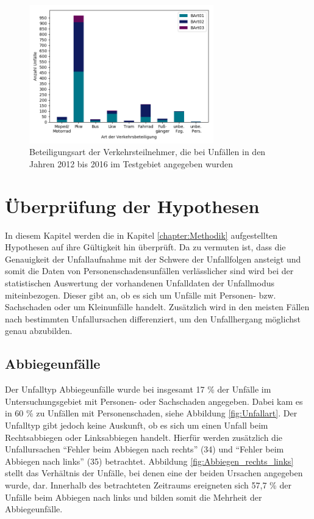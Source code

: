 \begin{savenotes}
	\begin{figure}[H]
		\centering
		\includegraphics[width=8cm,height=6cm]{figures/BArt}
		\caption[Beteiligungsart der Verkehrsteilnehmer, die bei Unfällen in den Jahren 2012 bis 2016 im Testgebiet angegeben wurden]{Beteiligungsart der Verkehrsteilnehmer, die bei Unfällen in den Jahren 2012 bis 2016 im Testgebiet angegeben wurden}\label{fig:Beteiligungsart}
	\end{figure}
\end{savenotes}

\section{Überprüfung der Hypothesen}\label{sechtion:Überprüfung der Thesen}
In diesem Kapitel werden die in Kapitel \ref{chapter:Methodik} aufgestellten Hypothesen auf ihre Gültigkeit hin überprüft. Da zu vermuten ist, dass die Genauigkeit der Unfallaufnahme mit der Schwere der Unfallfolgen ansteigt und somit die Daten von Personenschadensunfällen verlässlicher sind \parencite[S. 11]{StatistischesBundesamt.2018b} wird bei der statistischen Auswertung der vorhandenen Unfalldaten der Unfallmodus miteinbezogen. Dieser gibt an, ob es sich um Unfälle mit Personen- bzw. Sachschaden oder um Kleinunfälle handelt. Zusätzlich wird in den meisten Fällen nach bestimmten Unfallursachen differenziert, um den Unfallhergang möglichst genau abzubilden. %

\subsection{Abbiegeunfälle}\label{subsechtion:Abbiegeunfälle}
Der Unfalltyp Abbiegeunfälle wurde bei insgesamt 17 \% der Unfälle im Untersuchungsgebiet mit Personen- oder Sachschaden angegeben. Dabei kam es in 60 \% zu Unfällen mit Personenschaden, siehe Abbildung \ref{fig:Unfallart}. Der Unfalltyp gibt jedoch keine Auskunft, ob es sich um einen Unfall beim Rechtsabbiegen oder Linksabbiegen handelt. Hierfür werden zusätzlich die Unfallursachen \enquote{Fehler beim Abbiegen nach rechts} (34) und \enquote{Fehler beim Abbiegen nach links} (35) betrachtet. Abbildung \ref{fig:Abbiegen_rechts_links} stellt das Verhältnis der Unfälle, bei denen eine der beiden Ursachen angegeben wurde, dar. Innerhalb des betrachteten Zeitraums ereigneten sich 57,7 \% der Unfälle beim Abbiegen nach links und bilden somit die Mehrheit der Abbiegeunfälle.

